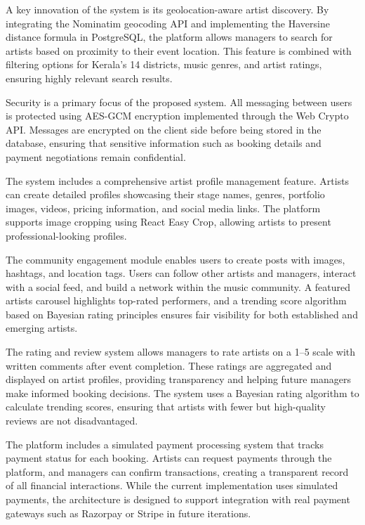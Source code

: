 \documentclass[12pt,a4paper]{report}
\begin{document}
A key innovation of the system is its geolocation-aware artist discovery. By integrating the Nominatim geocoding API and implementing the Haversine distance formula in PostgreSQL, the platform allows managers to search for artists based on proximity to their event location. This feature is combined with filtering options for Kerala's 14 districts, music genres, and artist ratings, ensuring highly relevant search results.

Security is a primary focus of the proposed system. All messaging between users is protected using AES-GCM encryption implemented through the Web Crypto API. Messages are encrypted on the client side before being stored in the database, ensuring that sensitive information such as booking details and payment negotiations remain confidential.

The system includes a comprehensive artist profile management feature. Artists can create detailed profiles showcasing their stage names, genres, portfolio images, videos, pricing information, and social media links. The platform supports image cropping using React Easy Crop, allowing artists to present professional-looking profiles.

The community engagement module enables users to create posts with images, hashtags, and location tags. Users can follow other artists and managers, interact with a social feed, and build a network within the music community. A featured artists carousel highlights top-rated performers, and a trending score algorithm based on Bayesian rating principles ensures fair visibility for both established and emerging artists.

The rating and review system allows managers to rate artists on a 1--5 scale with written comments after event completion. These ratings are aggregated and displayed on artist profiles, providing transparency and helping future managers make informed booking decisions. The system uses a Bayesian rating algorithm to calculate trending scores, ensuring that artists with fewer but high-quality reviews are not disadvantaged.

The platform includes a simulated payment processing system that tracks payment status for each booking. Artists can request payments through the platform, and managers can confirm transactions, creating a transparent record of all financial interactions. While the current implementation uses simulated payments, the architecture is designed to support integration with real payment gateways such as Razorpay or Stripe in future iterations.
\end{document}
